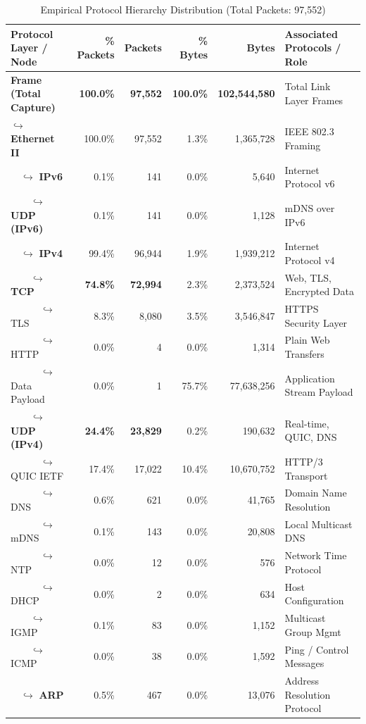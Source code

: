 \documentclass[11pt,a4paper]{article}
\begin{document}
\begin{table}[H]
\centering
\caption{Empirical Protocol Hierarchy Distribution (Total Packets: 97,552)}
\label{tab:protocol_stats}
\begin{tabularx}{\linewidth}{lrrrrX}
\toprule
\textbf{Protocol Layer / Node} & \textbf{\% Packets} & \textbf{Packets} & \textbf{\% Bytes} & \textbf{Bytes} & \textbf{Associated Protocols / Role} \\
\midrule
\textbf{Frame (Total Capture)} & \textbf{100.0\%} & \textbf{97,552} & \textbf{100.0\%} & \textbf{102,544,580} & Total Link Layer Frames \\
$\hookrightarrow$ \textbf{Ethernet II} & 100.0\% & 97,552 & 1.3\% & 1,365,728 & IEEE 802.3 Framing \\
$\quad\hookrightarrow$ \textbf{IPv6} & 0.1\% & 141 & 0.0\% & 5,640 & Internet Protocol v6 \\
$\quad\quad\hookrightarrow$ \textbf{UDP (IPv6)} & 0.1\% & 141 & 0.0\% & 1,128 & mDNS over IPv6 \\
$\quad\hookrightarrow$ \textbf{IPv4} & 99.4\% & 96,944 & 1.9\% & 1,939,212 & Internet Protocol v4 \\
$\quad\quad\hookrightarrow$ \textbf{TCP} & \textbf{74.8\%} & \textbf{72,994} & 2.3\% & 2,373,524 & Web, TLS, Encrypted Data \\
$\quad\quad\quad\hookrightarrow$ TLS & 8.3\% & 8,080 & 3.5\% & 3,546,847 & HTTPS Security Layer \\
$\quad\quad\quad\hookrightarrow$ HTTP & 0.0\% & 4 & 0.0\% & 1,314 & Plain Web Transfers \\
$\quad\quad\quad\hookrightarrow$ Data Payload & 0.0\% & 1 & 75.7\% & 77,638,256 & Application Stream Payload \\
$\quad\quad\hookrightarrow$ \textbf{UDP (IPv4)} & \textbf{24.4\%} & \textbf{23,829} & 0.2\% & 190,632 & Real-time, QUIC, DNS \\
$\quad\quad\quad\hookrightarrow$ QUIC IETF & 17.4\% & 17,022 & 10.4\% & 10,670,752 & HTTP/3 Transport \\
$\quad\quad\quad\hookrightarrow$ DNS & 0.6\% & 621 & 0.0\% & 41,765 & Domain Name Resolution \\
$\quad\quad\quad\hookrightarrow$ mDNS & 0.1\% & 143 & 0.0\% & 20,808 & Local Multicast DNS \\
$\quad\quad\quad\hookrightarrow$ NTP & 0.0\% & 12 & 0.0\% & 576 & Network Time Protocol \\
$\quad\quad\quad\hookrightarrow$ DHCP & 0.0\% & 2 & 0.0\% & 634 & Host Configuration \\
$\quad\quad\hookrightarrow$ IGMP & 0.1\% & 83 & 0.0\% & 1,152 & Multicast Group Mgmt \\
$\quad\quad\hookrightarrow$ ICMP & 0.0\% & 38 & 0.0\% & 1,592 & Ping / Control Messages \\
$\quad\hookrightarrow$ \textbf{ARP} & 0.5\% & 467 & 0.0\% & 13,076 & Address Resolution Protocol \\
\bottomrule
\end{tabularx}
\end{table}
\end{document}

